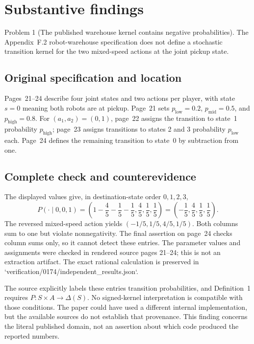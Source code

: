 \documentclass[10pt]{article}
\begin{document}
\section*{Substantive findings}
Problem 1 (The published warehouse kernel contains negative probabilities).  The Appendix F.2 robot-warehouse specification does not define a stochastic transition kernel for the two mixed-speed actions at the joint pickup state.\par
\subsection*{Original specification and location}
Pages 21–24 describe four joint states and two actions per player, with state \(s=0\) meaning both robots are at pickup. Page 21 sets \(p_{\mathrm{low}}=0.2\), \(p_{\mathrm{mid}}=0.5\), and \(p_{\mathrm{high}}=0.8\). For \((a_1,a_2)=(0,1)\), page 22 assigns the transition to state 1 probability \(p_{\mathrm{high}}\); page 23 assigns transitions to states 2 and 3 probability \(p_{\mathrm{low}}\) each. Page 24 defines the remaining transition to state 0 by subtraction from one.\par
\subsection*{Complete check and counterevidence}
The displayed values give, in destination-state order \(0,1,2,3\), \[P(\cdot\mid0,0,1)=
 \left(1-\frac45-\frac15-\frac15,\frac45,\frac15,\frac15\right)
 =\left(-\frac15,\frac45,\frac15,\frac15\right).\] The reversed mixed-speed action yields \((-1/5,1/5,4/5,1/5)\). Both columns sum to one but violate nonnegativity. The final assertion on page 24 checks column sums only, so it cannot detect these entries. The parameter values and assignments were checked in rendered source pages 21–24; this is not an extraction artifact. The exact rational calculation is preserved in `verification/0174/independent\_results.json`.\par
The source explicitly labels these entries transition probabilities, and Definition 1 requires \(P:S\times A\to\Delta(S)\). No signed-kernel interpretation is compatible with those conditions. The paper could have used a different internal implementation, but the available sources do not establish that provenance. This finding concerns the literal published domain, not an assertion about which code produced the reported numbers.\par
\end{document}

